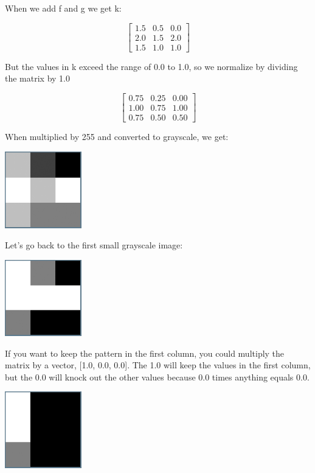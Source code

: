 When we add f and g we get k:

$$\begin{bmatrix}
1.5 & 0.5 & 0.0\\
2.0 & 1.5 & 2.0\\
1.5 & 1.0 & 1.0 
\end{bmatrix}$$

But the values in k exceed the range of 0.0 to 1.0, so we normalize by dividing the matrix by 1.0

$$\begin{bmatrix}
0.75 & 0.25 & 0.00\\
1.00 & 0.75 & 1.00\\
0.75 & 0.50 & 0.50  
\end{bmatrix}$$

When multiplied by 255 and converted to grayscale, we get:

\includegraphics[width=0.25\textwidth]{fgBitmapAdded.png}

Let's go back to the first small grayscale image:

\includegraphics[width=0.25\textwidth]{fBitmap.png}

If you want to keep the pattern in the first column, you could multiply the matrix by a vector, [1.0, 0.0, 0.0]. The 1.0 will keep the values in the first column, but the 0.0 will knock out the other values because 0.0 times anything equals 0.0.

\includegraphics[width=0.25\textwidth]{onechannel.png}

